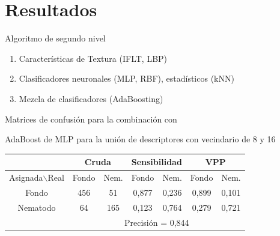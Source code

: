 \documentclass[15pt]{beamer} %
\begin{document}
\section{Resultados}

\begin{frame}{Algoritmo de segundo nivel}
  
  \begin{enumerate}
  \item Características de Textura (IFLT, LBP)
  \item Clasificadores neuronales (MLP, RBF), estadísticos (kNN)
  \item Mezcla de clasificadores (AdaBoosting)
  \end{enumerate}


  \begin{center}
    {\footnotesize Matrices de confusión para la combinación con}

    {\footnotesize AdaBoost de MLP para la unión de descriptores con 
      vecindario de 8 y 16}
    \begin{tabular}{|c|cc|cc|cc|}
      \hline
      & \multicolumn{2}{c|}{Cruda} & \multicolumn{2}{c|}{Sensibilidad} & 
      \multicolumn{2}{c|}{VPP} \\
      \hline
      Asignada$\backslash$Real& Fondo & Nem.& Fondo & Nem.& Fondo & Nem. \\
      \hline
      Fondo & 456 & 51 & 0,877 & 0,236 & 0,899 & 0,101 \\
      Nematodo & 64 & 165 & 0,123 & 0,764 & 0,279 & 0,721 \\
      \hline
      & \multicolumn{6}{c|}{Precisión = 0,844}\\
      \hline
    \end{tabular}
  \end{center}
\end{frame}
\end{document}
